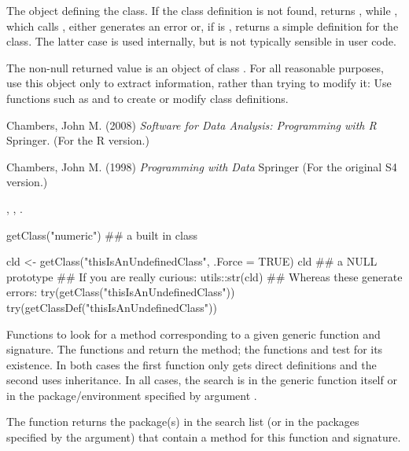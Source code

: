 %
\begin{Value}
The object defining the class. If the class definition is not found,
 returns , while , which
calls , either generates an error or, if
 is , returns a simple definition for the
class.  The latter case is used internally, but is not typically
sensible in user code.

The non-null returned value is an object of class
.  For all reasonable
purposes, use this object only to extract information, rather than trying
to modify it: Use functions such as  and
 to create or modify class definitions.
\end{Value}
%
\begin{References}\relax
Chambers, John M. (2008)
\emph{Software for Data Analysis: Programming with R}
Springer.  (For the R version.)

Chambers, John M. (1998)
\emph{Programming with Data}
Springer (For the original S4 version.)
\end{References}
%
\begin{SeeAlso}\relax
{},
,
.
\end{SeeAlso}
%
\begin{Examples}
\begin{ExampleCode}
getClass("numeric") ## a built in class

cld <- getClass("thisIsAnUndefinedClass", .Force = TRUE)
cld ## a NULL prototype
## If you are really curious:
utils::str(cld)
## Whereas these generate errors:
try(getClass("thisIsAnUndefinedClass"))
try(getClassDef("thisIsAnUndefinedClass"))
\end{ExampleCode}
\end{Examples}
%
\begin{Description}\relax
Functions to look for a method corresponding to a given generic function and signature.
The functions  and  return the method; the functions 
and  test for its existence.  In both
cases the first function only gets direct definitions and the second
uses inheritance.  In all cases, the search is in the generic function itself or in the package/environment specified by argument .

The function  returns the package(s) in the search
list (or in the packages specified by the  argument) that
contain a method for this function and signature.
\end{Description}
